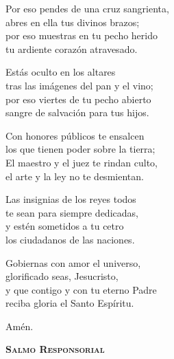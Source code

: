 \documentclass[12pt, letterpaper]{report}
\begin{document}
    \noindent
    Por eso pendes de una cruz sangrienta,\\
    abres en ella tus divinos brazos;\\
    por eso muestras en tu pecho herido\\
    tu ardiente coraz\'on atravesado.

    \noindent
    Est\'as oculto en los altares\\
    tras las im\'agenes del pan y el vino;\\
    por eso viertes de tu pecho abierto\\
    sangre de salvaci\'on para tus hijos.

    \noindent
    Con honores p\'ublicos te ensalcen\\
    los que tienen poder sobre la tierra;\\
    El maestro y el juez te rindan  culto,\\
    el arte y la ley no te desmientan.

    \noindent
    Las insignias de los reyes todos\\
    te sean para siempre dedicadas,\\
    y est\'en sometidos a tu cetro\\
    los ciudadanos de las naciones.

    \noindent
    Gobiernas con amor el universo,\\
    glorificado seas, Jesucristo,\\
    y que contigo y con tu eterno Padre\\
    reciba gloria el Santo Esp\'iritu.

    \noindent
    Am\'en.
    \clearpage




    \begin{center}
        {\scshape \Huge {\bfseries Salmo Responsorial}}
    \end{center}
\end{document}
